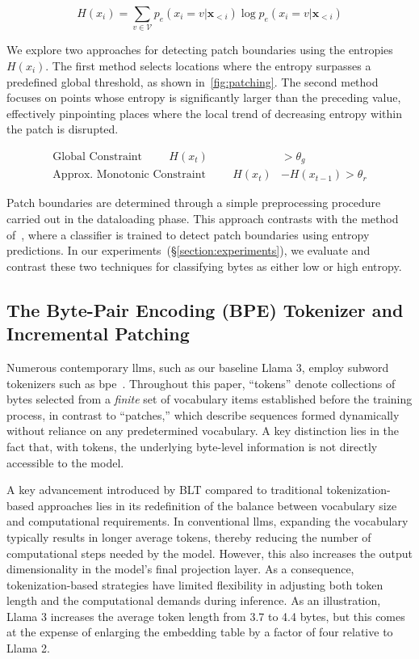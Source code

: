 \begin{equation}
H(x_i) = \sum_{v \in \mathcal{V}} p_{e}(x_i=v|\pmb{x}_{<i}) \log p_{e}(x_i=v|\pmb{x}_{<i})
\end{equation}

We explore two approaches for detecting patch boundaries using the entropies $H(x_i)$. The first method selects locations where the entropy surpasses a predefined global threshold, as shown in~\autoref{fig:patching}. The second method focuses on points whose entropy is significantly larger than the preceding value, effectively pinpointing places where the local trend of decreasing entropy within the patch is disrupted.

\begin{align*}
    \text{Global Constraint}\hspace{1cm}H(x_t)& > \theta_g\\
    \text{Approx. Monotonic Constraint}\hspace{1cm}H(x_t)& - H(x_{t-1}) > \theta_r
\end{align*}

Patch boundaries are determined through a simple preprocessing procedure carried out in the dataloading phase. This approach contrasts with the method of~\citet{nawrot-etal-2023-efficient}, where a classifier is trained to detect patch boundaries using entropy predictions. In our experiments~(\S\ref{section:experiments}), we evaluate and contrast these two techniques for classifying bytes as either low or high entropy.

\subsection{The Byte-Pair Encoding (BPE) Tokenizer and Incremental Patching}
\label{section:incremental-patching}
\label{section:bpe-patch}

Numerous contemporary llms, such as our baseline Llama 3, employ subword tokenizers such as bpe~\citep{gage1994new, sennrich-etal-2016-neural}. Throughout this paper, ``tokens'' denote collections of bytes selected from a \textit{finite} set of vocabulary items established before the training process, in contrast to ``patches,'' which describe sequences formed dynamically without reliance on any predetermined vocabulary. A key distinction lies in the fact that, with tokens, the underlying byte-level information is not directly accessible to the model.

A key advancement introduced by {\textsc BLT} compared to traditional tokenization-based approaches lies in its redefinition of the balance between vocabulary size and computational requirements. In conventional llms, expanding the vocabulary typically results in longer average tokens, thereby reducing the number of computational steps needed by the model. However, this also increases the output dimensionality in the model's final projection layer. As a consequence, tokenization-based strategies have limited flexibility in adjusting both token length and the computational demands during inference. As an illustration, Llama 3 increases the average token length from 3.7 to 4.4 bytes, but this comes at the expense of enlarging the embedding table by a factor of four relative to Llama 2.

